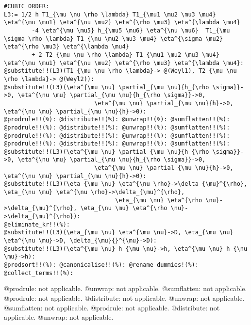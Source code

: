 \documentclass[11pt]{article}
\begin{document}
{\color[named]{Blue}\begin{verbatim}
#CUBIC ORDER:
L3:= 1/2 h T1_{\mu \nu \rho \lambda} T1_{\mu1 \mu2 \mu3 \mu4} \eta^{\mu \mu1} \eta^{\nu \mu2} \eta^{\rho \mu3} \eta^{\lambda \mu4}
        -4 \eta^{\mu \mu5} h_{\mu5 \mu6} \eta^{\nu \mu6}  T1_{\mu \sigma \rho \lambda} T1_{\nu \mu2 \mu3 \mu4} \eta^{\sigma \mu2} \eta^{\rho \mu3} \eta^{\lambda \mu4}
        + 2 T2_{\mu \nu \rho \lambda} T1_{\mu1 \mu2 \mu3 \mu4} \eta^{\mu \mu1} \eta^{\nu \mu2} \eta^{\rho \mu3} \eta^{\lambda \mu4}: 
@substitute!!(L3)(T1_{\mu \nu \rho \lambda}-> @(Weyl1), T2_{\mu \nu \rho \lambda}-> @(Weyl2)):
@substitute!!(L3)(\eta^{\mu \nu} \partial_{\mu \nu}{h_{\rho \sigma}}->0, \eta^{\nu \mu} \partial_{\mu \nu}{h_{\rho \sigma}}->0,
                          \eta^{\mu \nu} \partial_{\mu \nu}{h}->0, \eta^{\nu \mu} \partial_{\mu \nu}{h}->0):
@prodrule!!(%): @distribute!!(%): @unwrap!!(%): @sumflatten!!(%):
@prodrule!!(%): @distribute!!(%): @unwrap!!(%): @sumflatten!!(%):
@prodrule!!(%): @distribute!!(%): @unwrap!!(%): @sumflatten!!(%):
@prodrule!!(%): @distribute!!(%): @unwrap!!(%): @sumflatten!!(%):
@substitute!!(L3)(\eta^{\mu \nu} \partial_{\mu \nu}{h_{\rho \sigma}}->0, \eta^{\nu \mu} \partial_{\mu \nu}{h_{\rho \sigma}}->0,
                          \eta^{\mu \nu} \partial_{\mu \nu}{h}->0, \eta^{\nu \mu} \partial_{\mu \nu}{h}->0):
@substitute!!(L3)(\eta_{\mu \nu} \eta^{\nu \rho}->\delta_{\mu}^{\rho}, \eta_{\nu \mu} \eta^{\nu \rho}->\delta_{\mu}^{\rho},
                                \eta_{\mu \nu} \eta^{\rho \nu}->\delta_{\mu}^{\rho}, \eta_{\nu \mu} \eta^{\rho \nu}->\delta_{\mu}^{\rho}):
@eliminate_kr!!(%):
@substitute!!(L3)(\eta_{\mu \nu} \eta^{\mu \nu}->D, \eta_{\mu \nu} \eta^{\nu \mu}->D, \delta_{\mu}{}^{\mu}->D):
@substitute!!(L3)(\eta^{\mu \nu} h_{\mu \nu}->h, \eta^{\mu \nu} h_{\nu \mu}->h):
@prodsort!!(%): @canonicalise!!(%): @rename_dummies!(%): @collect_terms!!(%):
\end{verbatim}}
@prodrule: not applicable.
@unwrap: not applicable.
@sumflatten: not applicable.
@prodrule: not applicable.
@distribute: not applicable.
@unwrap: not applicable.
@sumflatten: not applicable.
@prodrule: not applicable.
@distribute: not applicable.
@unwrap: not applicable.
\end{document}
